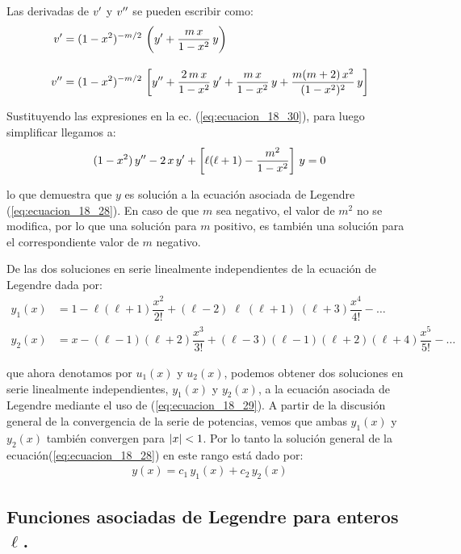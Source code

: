 Las derivadas de ${v}^{\prime}$ y ${v}^{\prime \prime}$ se pueden escribir como:
\begin{align*}
{v}^{\prime} &= (1 - x^{2})^{-m/2} \, \left( {y}^{\prime} + \dfrac{m \, x}{1 -x^{2}} \, y \right) \\[1em]
{v}^{\prime \prime} &= (1 - x^{2})^{-m/2} \, \left[ {y}^{\prime \prime} + \dfrac{2 \, m \, x}{1 -x^{2}} \, {y}^{\prime} + \dfrac{m \, x}{1 -x^{2}} \, y + \dfrac{m(m + 2) \, x^{2}}{(1 -x^{2})^{2}} \, y \right]
\end{align*}

Sustituyendo las expresiones en la ec. (\ref{eq:ecuacion_18_30}), para luego simplificar llegamos a:
\begin{align*}
(1 - x^{2}) \, {y}^{\prime \prime} - 2 \, x \, {y}^{\prime} + \left[ \ell (\ell + 1) - \dfrac{m^{2}}{1 - x^{2}} \right] \, y = 0
\end{align*}

lo que demuestra que $y$ es solución a la ecuación asociada de Legendre (\ref{eq:ecuacion_18_28}). En caso de que $m$ sea negativo, el valor de $m^{2}$ no se modifica, por lo que una solución para $m$ positivo, es también una solución para el correspondiente valor de $m$ negativo.
\par
De las dos soluciones en serie linealmente independientes de la ecuación de Legendre dada por:
\begin{align*}
y_{1}(x) &= 1 - \ell (\ell + 1) \dfrac{x^{2}}{2!} + (\ell - 2)\; \ell \; (\ell + 1)\;(\ell + 3) \dfrac{x^{4}}{4!} - \ldots \\[1em]
y_{2}(x) &= x - (\ell - 1)(\ell + 2) \dfrac{x^{3}}{3!} + (\ell - 3) (\ell - 1)(\ell + 2)(\ell + 4) \dfrac{x^{5}}{5!} - \ldots
\end{align*}

que ahora denotamos por $u_{1} (x)$ y $u_{2}(x)$, podemos obtener dos soluciones en serie linealmente independientes, $y_{1} (x)$ y $y_{2} (x)$, a la ecuación asociada de Legendre mediante el uso de (\ref{eq:ecuacion_18_29}). A partir de la discusión general de la convergencia de la serie de potencias, vemos que ambas $y_{1} (x)$ y $y_{2} (x)$ también convergen para $\abs{x} < 1$. Por lo tanto la solución general de la ecuación(\ref{eq:ecuacion_18_28}) en este rango está dado por:
\begin{align*}
y(x) = c_{1} \, y_{1} (x) + c_{2} \, y_{2} (x)
\end{align*}

\subsection{Funciones asociadas de Legendre para enteros \texorpdfstring{$\ell$}{l}.}


